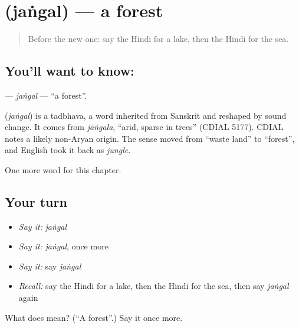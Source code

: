 \section[\texorpdfstring{\hi{जंगल} (jaṅgal)}{जंगल (jaṅgal)}]{ (jaṅgal) — a forest}

\label{lesson:HI-C143-jangal}



\begin{quote}
Before the new one: say the Hindi for a lake, then the Hindi for the sea.
\end{quote}

\subsection*{You'll want to know: }
\textbf{} — \emph{jaṅgal} — \textquotedblleft{}a forest\textquotedblright{}.

\begin{cousinweb}
\textbf{} (\emph{jaṅgal}) is a tadbhava, a word inherited from Sanskrit and reshaped by sound change. It comes from \emph{jāṅgala}, \textquotedblleft{}arid, sparse in trees\textquotedblright{} (CDIAL 5177). CDIAL notes a likely non-Aryan origin. The sense moved from \textquotedblleft{}waste land\textquotedblright{} to \textquotedblleft{}forest\textquotedblright{}, and English took it back as \emph{jungle}.
\end{cousinweb}

\begin{grammarlens}[title={What you've built}]
One more word for this chapter.
\end{grammarlens}

\subsection*{Your turn}
\begin{itemize}
\raggedright
  \item \emph{Say it:} \emph{jaṅgal}
  \item \emph{Say it:} \emph{jaṅgal}, once more
  \item \emph{Say it:} say \emph{jaṅgal}
  \item \emph{Recall:} say the Hindi for a lake, then the Hindi for the sea, then say \emph{jaṅgal} again
\end{itemize}

\begin{tcolorbox}[breakable,colback=teal!4,colframe=teal!35!black,title={Before you move on}]
What does  mean? (\textquotedblleft{}A forest\textquotedblright{}.) Say it once more.
\end{tcolorbox}

